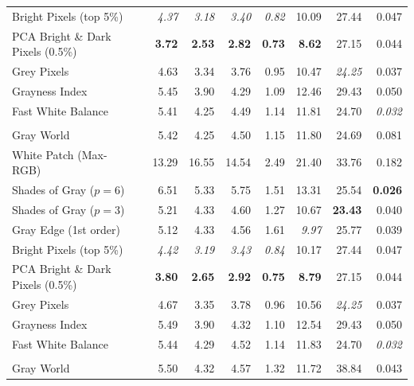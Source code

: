 \begin{longtable}{@{}>{\raggedright\arraybackslash}p{6.8cm}rrrrrrr@{}}
Bright Pixels (top 5\%)~\cite{bright_pixels} & \textit{4.37} & \textit{3.18} & \textit{3.40} & \textit{0.82} & 10.09 & 27.44 & 0.047 \\
PCA Bright \& Dark Pixels (0.5\%)~\cite{cheng2014illuminant} & \textbf{3.72} & \textbf{2.53} & \textbf{2.82} & \textbf{0.73} & \textbf{8.62} & 27.15 & 0.044 \\
Grey Pixels~\cite{yangGrayPixels} & 4.63 & 3.34 & 3.76 & 0.95 & 10.47 & \textit{24.25} & 0.037 \\
Grayness Index~\cite{qianFindingGrayPixels} & 5.45 & 3.90 & 4.29 & 1.09 & 12.46 & 29.43 & 0.050 \\
Fast White Balance~\cite{fast_wb_greyness} & 5.41 & 4.25 & 4.49 & 1.14 & 11.81 & 24.70 & \textit{0.032} \\
\midrule
\multicolumn{8}{@{}l}{\textbf{NUS 8-Camera (extended)~\cite{cheng2014illuminant} ($N=1853$)}} \\
\midrule
Gray World~\cite{gray_world} & 5.42 & 4.25 & 4.50 & 1.15 & 11.80 & 24.69 & 0.081 \\
White Patch (Max-RGB)~\cite{white_patch} & 13.29 & 16.55 & 14.54 & 2.49 & 21.40 & 33.76 & 0.182 \\
Shades of Gray ($p=6$)~\cite{shades_of_gray} & 6.51 & 5.33 & 5.75 & 1.51 & 13.31 & 25.54 & \textbf{0.026} \\
Shades of Gray ($p=3$)~\cite{shades_of_gray} & 5.21 & 4.33 & 4.60 & 1.27 & 10.67 & \textbf{23.43} & 0.040 \\
Gray Edge (1st order)~\cite{gray_edge} & 5.12 & 4.33 & 4.56 & 1.61 & \textit{9.97} & 25.77 & 0.039 \\
Bright Pixels (top 5\%)~\cite{bright_pixels} & \textit{4.42} & \textit{3.19} & \textit{3.43} & \textit{0.84} & 10.17 & 27.44 & 0.047 \\
PCA Bright \& Dark Pixels (0.5\%)~\cite{cheng2014illuminant} & \textbf{3.80} & \textbf{2.65} & \textbf{2.92} & \textbf{0.75} & \textbf{8.79} & 27.15 & 0.044 \\
Grey Pixels~\cite{yangGrayPixels} & 4.67 & 3.35 & 3.78 & 0.96 & 10.56 & \textit{24.25} & 0.037 \\
Grayness Index~\cite{qianFindingGrayPixels} & 5.49 & 3.90 & 4.32 & 1.10 & 12.54 & 29.43 & 0.050 \\
Fast White Balance~\cite{fast_wb_greyness} & 5.44 & 4.29 & 4.52 & 1.14 & 11.83 & 24.70 & \textit{0.032} \\
\midrule
\multicolumn{8}{@{}l}{\textbf{LSMI~\cite{kim2021lsmi} ($N=3396$)}} \\
\midrule
Gray World~\cite{gray_world} & 5.50 & 4.32 & 4.57 & 1.32 & 11.72 & 38.84 & 0.043 \\

\end{longtable}
